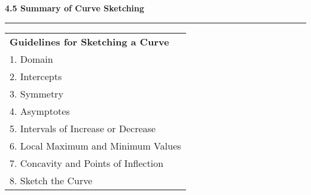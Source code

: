 \documentclass{article}
\begin{document}
\begin{center}
\Large\textbf{4.5 Summary of Curve Sketching}

\noindent\hfill\rule{0.3\textwidth}{.4pt}\hfill
\vspace{24pt}

\large
\def\arraystretch{1.3}
{\setlength{\tabcolsep}{16pt}
\begin{tabularx}{.9\textwidth}{|X|}
\hline
	\vspace{5pt}
	\textbf{Guidelines for Sketching a Curve} \\[5pt]
	1. Domain \\
	2. Intercepts \\
	3. Symmetry \\
	4. Asymptotes \\
	5. Intervals of Increase or Decrease \\
	6. Local Maximum and Minimum Values \\
	7. Concavity and Points of Inflection \\
	8. Sketch the Curve \\[12pt]
	
\hline
\end{tabularx}}
\end{center}
\pagebreak
\end{document}
